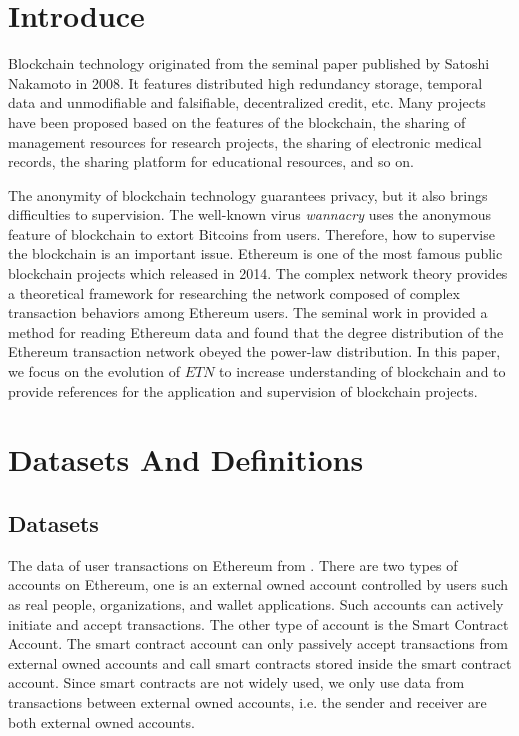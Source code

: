 \documentclass[conference]{IEEEtran}
\begin{document}
\begin{CJK*}{UTF8}{gbsn}
\section{Introduce}

Blockchain technology originated from the seminal paper published by Satoshi Nakamoto in 2008\cite{nakamoto 2019 bitcoin}. It features distributed high redundancy storage, temporal data and unmodifiable and falsifiable, decentralized credit, etc\cite{crosby2016blockchain}. Many projects have been proposed based on the features of the blockchain, the sharing of management resources for research projects\cite{bai2018researchain}, the sharing of electronic medical records\cite{ni2019healchain}, the sharing platform for educational resources\cite{hou2019educational}, and so on.

The anonymity of blockchain technology guarantees privacy, but it also brings difficulties to supervision. The well-known virus \textit{wannacry} uses the anonymous feature of blockchain to extort Bitcoins from users. Therefore, how to supervise the blockchain is an important issue. Ethereum is one of the most famous public blockchain projects which released in 2014\cite{wood2014ethereum}. The complex network theory provides a theoretical framework \cite{newman2003structure}\cite{barabasi2007architecture} for researching the network composed of complex transaction behaviors among Ethereum users. The seminal work in \cite{chen2018understanding} provided a method for reading Ethereum data and found that the degree distribution of the Ethereum transaction network obeyed the power-law distribution. In this paper, we focus on the evolution of $ETN$ to increase understanding of blockchain and to provide references for the application and supervision of blockchain projects.

\section{Datasets And Definitions}
\subsection{Datasets}

The data of user transactions on Ethereum from \cite{chen2018understanding}. There are two types of accounts on Ethereum, one is an external owned account controlled by users such as real people, organizations, and wallet applications. Such accounts can actively initiate and accept transactions. The other type of account is the Smart Contract Account. The smart contract account can only passively accept transactions from external owned accounts and call smart contracts stored inside the smart contract account. Since smart contracts are not widely used\cite{chen2018understanding}, we only use data from transactions between external owned accounts, i.e. the sender and receiver are both external owned accounts.


\end{CJK*}
\end{document}

